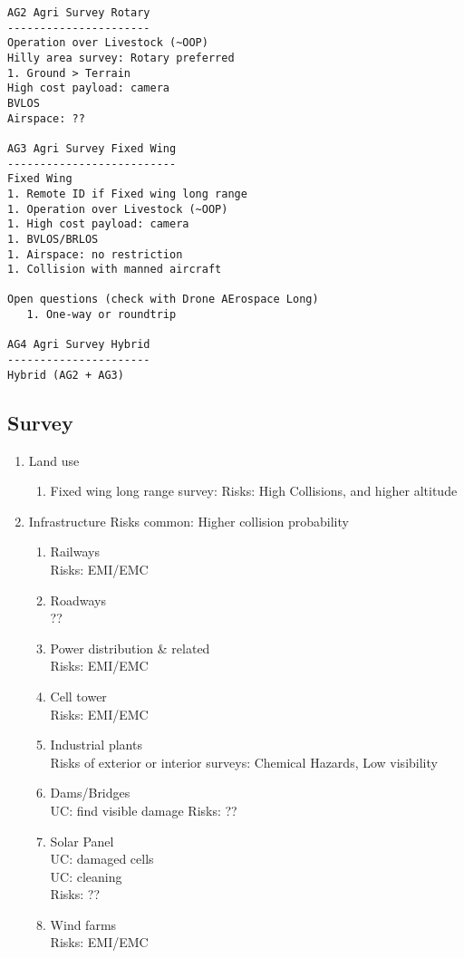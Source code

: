\documentclass{ua_wgs_base}
\begin{document}
\begin{enumerate}
\begin{verbatim}
AG2 Agri Survey Rotary 
----------------------
Operation over Livestock (~OOP)
Hilly area survey: Rotary preferred
1. Ground > Terrain
High cost payload: camera
BVLOS
Airspace: ??

AG3 Agri Survey Fixed Wing
--------------------------
Fixed Wing
1. Remote ID if Fixed wing long range
1. Operation over Livestock (~OOP)
1. High cost payload: camera
1. BVLOS/BRLOS
1. Airspace: no restriction
1. Collision with manned aircraft

Open questions (check with Drone AErospace Long)
   1. One-way or roundtrip 

AG4 Agri Survey Hybrid
----------------------
Hybrid (AG2 + AG3)

    \end{verbatim}

\end{enumerate}

\subsection{Survey} 

\begin{enumerate}


\item Land use
\begin{enumerate}
  \item Fixed wing long range survey: 
    Risks: High Collisions, and higher altitude
\end{enumerate}

\item Infrastructure
Risks common: Higher collision probability 
\begin{enumerate}
  \item Railways \\
    Risks: EMI/EMC
  \item Roadways \\
    ??
  \item Power distribution \& related \\
    Risks: EMI/EMC
  \item Cell tower \\
    Risks: EMI/EMC
  \item Industrial plants \\
    Risks of exterior or interior surveys: Chemical Hazards, Low visibility
  \item Dams/Bridges \\
    UC: find visible damage
    Risks: ??
  \item Solar Panel \\
    UC: damaged cells \\
    UC: cleaning \\
    Risks: ??
  \item Wind farms \\
    Risks: EMI/EMC
 
\end{enumerate}
\end{enumerate}
\end{document}
